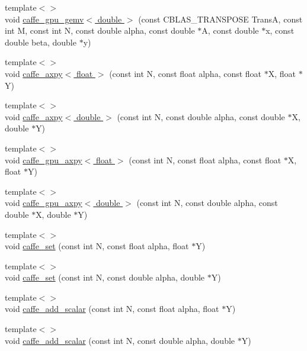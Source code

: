 \begin{DoxyCompactItemize}
\item 
{\footnotesize template$<$$>$ }\\void \hyperlink{namespacecaffe_a3eae967faa2cec456830fa960d4291a8}{caffe\+\_\+gpu\+\_\+gemv$<$ double $>$} (const C\+B\+L\+A\+S\+\_\+\+T\+R\+A\+N\+S\+P\+O\+S\+E Trans\+A, const int M, const int N, const double alpha, const double $\ast$A, const double $\ast$x, const double beta, double $\ast$y)
\item 
{\footnotesize template$<$$>$ }\\void \hyperlink{namespacecaffe_aaa105c828f9c1423a07a6edbf9dd44cd}{caffe\+\_\+axpy$<$ float $>$} (const int N, const float alpha, const float $\ast$X, float $\ast$Y)
\item 
{\footnotesize template$<$$>$ }\\void \hyperlink{namespacecaffe_a1429069b15b332c453b637fda744bc81}{caffe\+\_\+axpy$<$ double $>$} (const int N, const double alpha, const double $\ast$X, double $\ast$Y)
\item 
{\footnotesize template$<$$>$ }\\void \hyperlink{namespacecaffe_a446e6eac3d988abc8692c53e071bb3c0}{caffe\+\_\+gpu\+\_\+axpy$<$ float $>$} (const int N, const float alpha, const float $\ast$X, float $\ast$Y)
\item 
{\footnotesize template$<$$>$ }\\void \hyperlink{namespacecaffe_a5e351e80d7521de666576f7ea74378da}{caffe\+\_\+gpu\+\_\+axpy$<$ double $>$} (const int N, const double alpha, const double $\ast$X, double $\ast$Y)
\item 
{\footnotesize template$<$$>$ }\\void \hyperlink{namespacecaffe_a3b18f5aa14a23d75289faf394267b677}{caffe\+\_\+set} (const int N, const float alpha, float $\ast$Y)
\item 
{\footnotesize template$<$$>$ }\\void \hyperlink{namespacecaffe_a9e7a15ad6ea79b0843668dd72a8cd237}{caffe\+\_\+set} (const int N, const double alpha, double $\ast$Y)
\item 
{\footnotesize template$<$$>$ }\\void \hyperlink{namespacecaffe_a90978c3c773431b11c882e2a036bd2c2}{caffe\+\_\+add\+\_\+scalar} (const int N, const float alpha, float $\ast$Y)
\item 
{\footnotesize template$<$$>$ }\\void \hyperlink{namespacecaffe_a8894a527bd87ff85fd7f480ed4876917}{caffe\+\_\+add\+\_\+scalar} (const int N, const double alpha, double $\ast$Y)

\end{DoxyCompactItemize}
